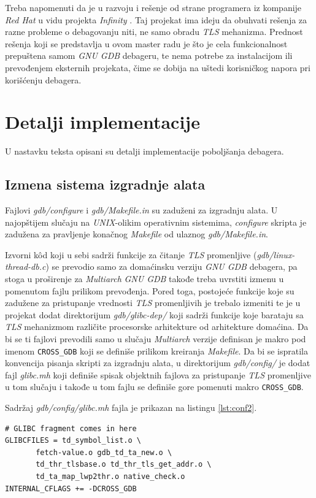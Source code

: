\documentclass[12pt,oneside]{memoir}
\begin{document}
Treba napomenuti da je u razvoju i rešenje od strane programera iz kompanije \emph{Red Hat} \cite{REDHAT} u vidu projekta \emph{Infinity} \cite{Infinity}. Taj projekat ima ideju da obuhvati rešenja za razne probleme o debagovanju niti, ne samo obradu \emph{TLS} mehanizma. Prednost rešenja koji se predstavlja u ovom master radu je što je cela funkcionalnost prepuštena samom \emph{GNU GDB} debageru, te nema potrebe za instalacijom ili prevođenjem eksternih projekata, čime se dobija na uštedi korisničkog napora pri korišćenju debagera.

\section{Detalji implementacije}

U nastavku teksta opisani su detalji implementacije poboljšanja debagera.

\subsection{Izmena sistema izgradnje alata}

Fajlovi \emph{gdb/configure} i \emph{gdb/Makefile.in} su zaduženi za izgradnju alata. U najopštijem slučaju na \emph{UNIX}-olikim operativnim sistemima, \emph{configure} skripta je zadužena za pravljenje konačnog \emph{Makefile} od ulaznog \emph{gdb/Makefile.in}.

Izvorni k\^{o}d koji u sebi sadrži funkcije za čitanje \emph{TLS} promenljive (\emph{gdb/linux-thread-db.c}) se prevodio samo za domaćinsku verziju \emph{GNU GDB} debagera, pa stoga u proširenje za \emph{Multiarch} \emph{GNU GDB} takođe treba uvrstiti izmenu u pomenutom fajlu prilikom prevođenja. Pored toga, postojeće funkcije koje su zadužene za pristupanje vrednosti \emph{TLS} promenljivih je trebalo izmeniti te je u projekat dodat direktorijum \emph{gdb/glibc-dep/} koji sadrži funkcije koje barataju sa \emph{TLS} mehanizmom različite procesorske arhitekture od arhitekture domaćina. Da bi se ti fajlovi prevodili samo u slučaju \emph{Multiarch} verzije definisan je makro pod imenom \texttt{CROSS\_GDB} koji se definiše prilikom kreiranja \emph{Makefile}. Da bi se ispratila konvencija pisanja skripti za izgradnju alata, u direktorijum \emph{gdb/config/} je dodat fajl \emph{glibc.mh} koji definiše spisak objektnih fajlova za pristupanje \emph{TLS} promenljive u tom slučaju i takođe u tom fajlu se definiše gore pomenuti makro \texttt{CROSS\_GDB}.

Sadržaj \emph{gdb/config/glibc.mh} fajla je prikazan na listingu \ref{lst:conf2}.
\begin{lstlisting}[label={lst:conf2}, caption={Sadržaj \emph{gdb/config/glibc.mh} fajla.}]
# GLIBC fragment comes in here
GLIBCFILES = td_symbol_list.o \
       fetch-value.o gdb_td_ta_new.o \
       td_thr_tlsbase.o td_thr_tls_get_addr.o \
       td_ta_map_lwp2thr.o native_check.o
INTERNAL_CFLAGS += -DCROSS_GDB
\end{lstlisting}
\end{document}
